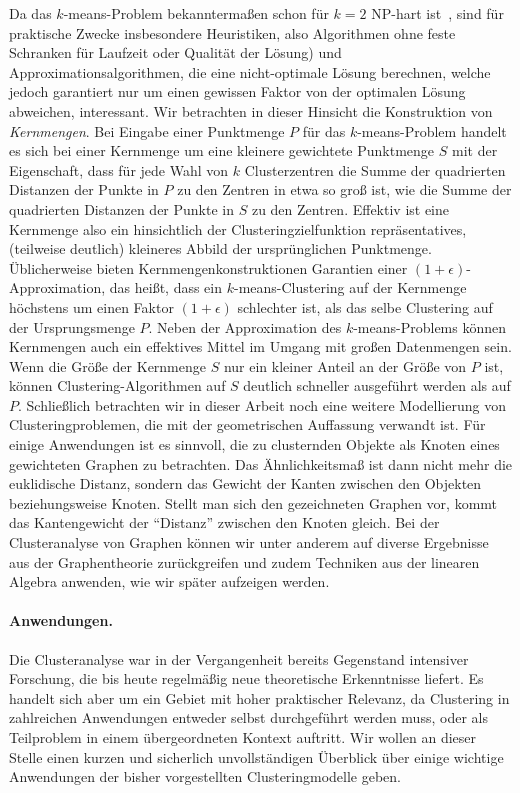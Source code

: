 Da das $k$-means-Problem bekanntermaßen schon für $k = 2$ NP-hart ist~\cite{AloiseDHP09}, sind für praktische Zwecke insbesondere
Heuristiken, also Algorithmen ohne feste Schranken für Laufzeit oder Qualität der Lösung) und
Approximationsalgorithmen, die eine nicht-optimale Lösung berechnen, welche jedoch garantiert nur um einen gewissen
Faktor von der optimalen Lösung abweichen, interessant. Wir betrachten in dieser Hinsicht die Konstruktion von \emph{Kernmengen}.
Bei Eingabe einer Punktmenge $P$ für das $k$-means-Problem handelt es sich bei einer Kernmenge um eine kleinere gewichtete
Punktmenge $S$ mit der Eigenschaft, dass für jede Wahl von $k$ Clusterzentren die Summe der quadrierten Distanzen der Punkte in
$P$ zu den Zentren in etwa so groß ist, wie die Summe der quadrierten Distanzen der Punkte in $S$ zu den Zentren. Effektiv ist
eine Kernmenge also ein hinsichtlich der Clusteringzielfunktion repräsentatives, (teilweise deutlich) kleineres Abbild der
ursprünglichen Punktmenge. Üblicherweise bieten Kernmengenkonstruktionen Garantien einer $(1 + \epsilon)$-Approximation,
das heißt, dass ein $k$-means-Clustering auf der Kernmenge höchstens um einen Faktor $(1 + \epsilon)$ schlechter ist, als das
selbe Clustering auf der Ursprungsmenge $P$. Neben der Approximation des $k$-means-Problems können Kernmengen auch ein
effektives Mittel im Umgang mit großen Datenmengen sein. Wenn die Größe der Kernmenge $S$ nur ein kleiner Anteil an der Größe
von $P$ ist, können Clustering-Algorithmen auf $S$ deutlich schneller ausgeführt werden als auf $P$.
\absatz
Schließlich betrachten wir in dieser Arbeit noch eine weitere Modellierung von Clusteringproblemen, die mit der geometrischen
Auffassung verwandt ist. Für einige Anwendungen ist es sinnvoll, die zu clusternden Objekte als Knoten eines gewichteten
Graphen zu betrachten. Das Ähnlichkeitsmaß ist dann nicht mehr die euklidische Distanz, sondern das Gewicht der Kanten zwischen
den Objekten beziehungsweise Knoten. Stellt man sich den gezeichneten Graphen vor, kommt das Kantengewicht der "`Distanz"'
zwischen den Knoten gleich. Bei der Clusteranalyse von Graphen können wir unter anderem auf diverse Ergebnisse aus der
Graphentheorie zurückgreifen und zudem Techniken aus der linearen Algebra anwenden, wie wir später aufzeigen werden.

\paragraph{Anwendungen.} Die Clusteranalyse war in der Vergangenheit bereits Gegenstand intensiver Forschung, die bis heute
regelmäßig neue theoretische Erkenntnisse liefert. Es handelt sich aber um ein Gebiet mit hoher praktischer Relevanz, da
Clustering in zahlreichen Anwendungen entweder selbst durchgeführt werden muss, oder als Teilproblem in einem übergeordneten
Kontext auftritt.
Wir wollen an dieser Stelle einen kurzen und sicherlich unvollständigen Überblick über einige wichtige Anwendungen
der bisher vorgestellten Clusteringmodelle geben.

